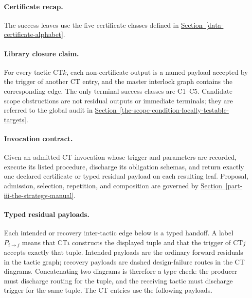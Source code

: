 \documentclass[
  11pt,
]{article}
\theoremstyle{definition}
\newcommand{\secref}[1]{\hyperref[#1]{Section~\ref*{#1}}}
\begin{document}
\paragraph{Certificate recap.}
The success leaves use the five certificate classes defined in
\secref{data-certificate-alphabet}.

\paragraph{Library closure claim.}
For every tactic CT\(k\), each non-certificate output is a named
payload accepted by the trigger of another CT entry, and the master
interlock graph contains the corresponding edge.  The only terminal
success classes are C1--C5. Candidate scope obstructions are not residual
outputs or immediate terminals; they are referred to the global audit in
\secref{the-scope-condition-locally-testable-targets}.

\paragraph{Invocation contract.}
Given an admitted CT invocation whose trigger and parameters are
recorded, execute its listed procedure, discharge its obligation
schemas, and return exactly one declared certificate or typed residual
payload on each resulting leaf.  Proposal, admission, selection,
repetition, and composition are governed by
\secref{part-iii-the-strategy-manual}.

\paragraph{Typed residual payloads.}
Each intended or recovery inter-tactic edge below is a typed handoff.  A
label \(P_{i\to j}\) means that CT\(i\) constructs the displayed tuple
and that the trigger of CT\(j\) accepts exactly that tuple.  Intended
payloads are the ordinary forward residuals in the tactic graph;
recovery payloads are dashed design-failure routes in the CT diagrams.
Concatenating two diagrams is therefore a type check: the producer must
discharge routing for the tuple, and the receiving tactic must discharge
trigger for the same tuple.  The CT entries use the following payloads.
\end{document}
